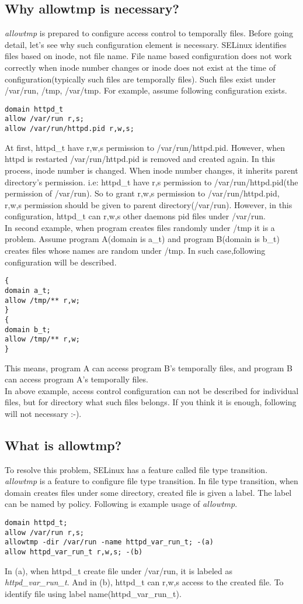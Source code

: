 \documentclass{article}
\begin{document}
\subsection{Why allowtmp is necessary?}
{\it allowtmp} is prepared to configure access control to temporally
files.
Before going detail, let's see why such configuration element is necessary.
SELinux identifies files based on inode, not file name. File name based
configuration does not work correctly when inode number changes or inode
does not exist at the time of configuration(typically such files are
temporally files).
Such files exist under  /var/run, /tmp, /var/tmp.
For example, assume following configuration exists.\\
\begin{verbatim}
domain httpd_t
allow /var/run r,s;
allow /var/run/httpd.pid r,w,s;
\end{verbatim}
At first, httpd\_t have r,w,s permission to /var/run/httpd.pid.
However, when httpd is restarted /var/run/httpd.pid is removed and
created again. In this process, inode number is changed. When inode
number changes, it inherits parent directory's permission. i.e:
 httpd\_t have r,s permission to /var/run/httpd.pid(the permission of
 /var/run). So to grant r,w,s permission to /var/run/httpd.pid, r,w,s
 permission should be given to parent directory(/var/run).
However, in this configuration, httpd\_t can r,w,s other daemons pid
files under /var/run. 
\\
In second example, when program creates files randomly under /tmp it is
a problem. Assume program  A(domain is a\_t) and program B(domain is
b\_t) creates files whose names are random under /tmp. In such
case,following configuration will be described.
\begin{verbatim}
{
domain a_t;
allow /tmp/** r,w;
}
{
domain b_t;
allow /tmp/** r,w;
}
\end{verbatim}
This means, program A can access program B's temporally files, and
program B can access program A's temporally files. \\
In above example, access control configuration can not be described for
individual files, but for directory what such files belongs.
If you think it is enough, following will not necessary :-).\\

\subsection{What is allowtmp?}
To resolve this problem, SELinux has a feature called file type
transition. {\it allowtmp } is a feature to configure file type
transition.
In file type transition, when domain creates files under some directory,
created file is given a label. The label can be named by policy.
Following is example  usage of {\it allowtmp}.
\begin{verbatim}
domain httpd_t;
allow /var/run r,s;
allowtmp -dir /var/run -name httpd_var_run_t; -(a)
allow httpd_var_run_t r,w,s; -(b)
\end{verbatim}
In (a), when httpd\_t create file under /var/run, it is labeled as {\it
httpd\_var\_run\_t}. And in (b), httpd\_t can r,w,s access to the
created file. To identify file using label name(httpd\_var\_run\_t).
\end{document}
